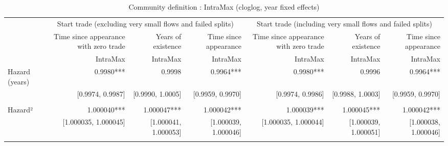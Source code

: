 \begin{table}[!h]
\caption{Community definition : IntraMax (cloglog, year fixed effects)}
\centering
\begin{tabular}{lllllll}
\cline{1-7}
\multicolumn{1}{c}{} &
  \multicolumn{3}{|c}{Start trade (excluding very small flows and failed splits)} &
  \multicolumn{3}{c}{Start trade (including very small flows and failed splits)} \\
\multicolumn{1}{c}{} &
  \multicolumn{1}{|r}{Time since appearance with zero trade} &
  \multicolumn{1}{r}{Years of existence} &
  \multicolumn{1}{r}{Time since appearance} &
  \multicolumn{1}{r}{Time since appearance with zero trade} &
  \multicolumn{1}{r}{Years of existence} &
  \multicolumn{1}{r}{Time since appearance} \\
\multicolumn{1}{c}{} &
  \multicolumn{1}{|r}{IntraMax} &
  \multicolumn{1}{r}{IntraMax} &
  \multicolumn{1}{r}{IntraMax} &
  \multicolumn{1}{r}{IntraMax} &
  \multicolumn{1}{r}{IntraMax} &
  \multicolumn{1}{r}{IntraMax} \\
\cline{1-7}
\multicolumn{1}{l}{Hazard (years)} &
  \multicolumn{1}{|r}{0.9980***} &
  \multicolumn{1}{r}{0.9998} &
  \multicolumn{1}{r}{0.9964***} &
  \multicolumn{1}{r}{0.9980***} &
  \multicolumn{1}{r}{0.9996} &
  \multicolumn{1}{r}{0.9964***} \\
\multicolumn{1}{l}{} &
  \multicolumn{1}{|r}{[0.9974, 0.9987]} &
  \multicolumn{1}{r}{[0.9990, 1.0005]} &
  \multicolumn{1}{r}{[0.9959, 0.9970]} &
  \multicolumn{1}{r}{[0.9974, 0.9986]} &
  \multicolumn{1}{r}{[0.9988, 1.0003]} &
  \multicolumn{1}{r}{[0.9959, 0.9970]} \\
\multicolumn{1}{l}{} &
  \multicolumn{1}{|r}{} &
  \multicolumn{1}{r}{} &
  \multicolumn{1}{r}{} &
  \multicolumn{1}{r}{} &
  \multicolumn{1}{r}{} &
  \multicolumn{1}{r}{} \\
\multicolumn{1}{l}{Hazard²} &
  \multicolumn{1}{|r}{1.000040***} &
  \multicolumn{1}{r}{1.000047***} &
  \multicolumn{1}{r}{1.000042***} &
  \multicolumn{1}{r}{1.000039***} &
  \multicolumn{1}{r}{1.000045***} &
  \multicolumn{1}{r}{1.000042***} \\
\multicolumn{1}{l}{} &
  \multicolumn{1}{|r}{[1.000035, 1.000045]} &
  \multicolumn{1}{r}{[1.000041, 1.000053]} &
  \multicolumn{1}{r}{[1.000039, 1.000046]} &
  \multicolumn{1}{r}{[1.000035, 1.000044]} &
  \multicolumn{1}{r}{[1.000039, 1.000051]} &
  \multicolumn{1}{r}{[1.000038, 1.000046]} \\
\multicolumn{1}{l}{} &
  \multicolumn{1}{|r}{} &
  \multicolumn{1}{r}{} &
  \multicolumn{1}{r}{} &

\end{tabular}
\end{table}
